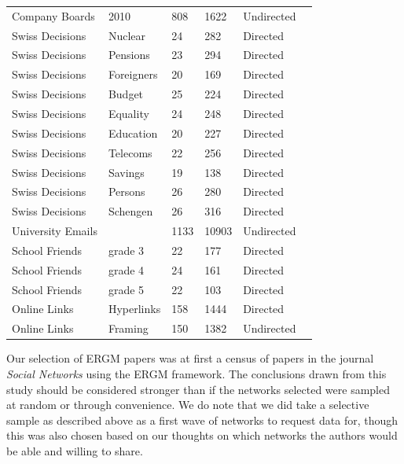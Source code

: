 \documentclass[
]{statsoc}
\begin{document}
\begin{table}
\begin{tabular}[t]{lllllr}
Company Boards & 2010 & 808 & 1622 & Undirected & \cite{Gygax2015}\\
\addlinespace
\rowcolor{gray!6}  Swiss Decisions & Nuclear & 24 & 282 & Directed & \cite{Fischer2015}\\
Swiss Decisions & Pensions & 23 & 294 & Directed & \cite{Fischer2015}\\
\rowcolor{gray!6}  Swiss Decisions & Foreigners & 20 & 169 & Directed & \cite{Fischer2015}\\
Swiss Decisions & Budget & 25 & 224 & Directed & \cite{Fischer2015}\\
\rowcolor{gray!6}  Swiss Decisions & Equality & 24 & 248 & Directed & \cite{Fischer2015}\\
Swiss Decisions & Education & 20 & 227 & Directed & \cite{Fischer2015}\\
\rowcolor{gray!6}  Swiss Decisions & Telecoms & 22 & 256 & Directed & \cite{Fischer2015}\\
Swiss Decisions & Savings & 19 & 138 & Directed & \cite{Fischer2015}\\
\rowcolor{gray!6}  Swiss Decisions & Persons & 26 & 280 & Directed & \cite{Fischer2015}\\
Swiss Decisions & Schengen & 26 & 316 & Directed & \cite{Fischer2015}\\
\addlinespace
\rowcolor{gray!6}  University Emails &  & 1133 & 10903 & Undirected & \cite{Toivonen2009}\\
\addlinespace
School Friends & grade 3 & 22 & 177 & Directed & \cite{Anderson1999}\\
\rowcolor{gray!6}  School Friends & grade 4 & 24 & 161 & Directed & \cite{Anderson1999}\\
School Friends & grade 5 & 22 & 103 & Directed & \cite{Anderson1999}\\
\addlinespace
\rowcolor{gray!6}  Online Links & Hyperlinks & 158 & 1444 & Directed & \cite{Ackland2011}\\
Online Links & Framing & 150 & 1382 & Undirected & \cite{Ackland2011}\\
\bottomrule
\end{tabular}
\end{table}

Our selection of ERGM papers was at first a census of papers in the
journal \textit{Social Networks} using the ERGM framework. The
conclusions drawn from this study should be considered stronger than if
the networks selected were sampled at random or through convenience. We
do note that we did take a selective sample as described above as a
first wave of networks to request data for, though this was also chosen
based on our thoughts on which networks the authors would be able and
willing to share.
\end{document}
